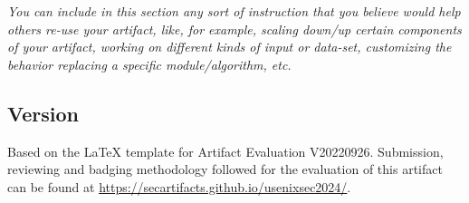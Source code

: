 \textit{You can include in this section any sort of instruction that you believe
would help others re-use your artifact, like, for example, scaling down/up
certain components of your artifact, working on different kinds of input or
data-set, customizing the behavior replacing a specific module/algorithm, etc.}


\subsection{Version}
Based on the LaTeX template for Artifact Evaluation V20220926. Submission,
reviewing and badging methodology followed for the evaluation of this artifact
can be found at \url{https://secartifacts.github.io/usenixsec2024/}.